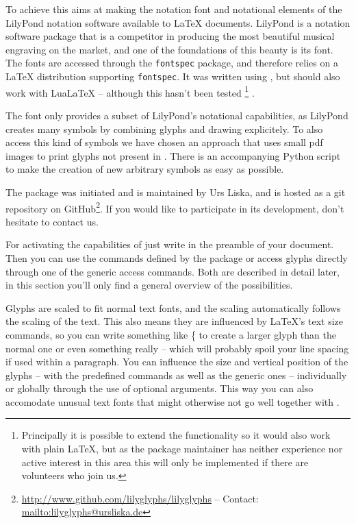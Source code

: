\documentclass{OLLbook}
\begin{document}
To achieve this \lilyglyphs aims at making the notation font and notational elements of the LilyPond notation software available to \LaTeX{} documents.
LilyPond is a notation software package that is a competitor in producing the most beautiful musical engraving on the market, and one of the foundations of this beauty is its \emmentaler font.
The \emmentaler fonts are accessed through the \texttt{fontspec} package, and \lilyglyphs therefore relies on a \LaTeX{} distribution supporting \texttt{fontspec}. 
It was written using , but should also work with LuaLaTeX -- although this hasn't been tested%
\footnote{Principally it is possible to extend the functionality so it would also work with plain \LaTeX, but as the package maintainer has neither experience nor active interest in this area this will only be implemented if there are volunteers who join us.}%
.

The \emmentaler font only provides a subset of LilyPond's notational capabilities, as LilyPond creates many symbols by combining glyphs and drawing explicitely.
To also access this kind of symbols we have chosen an approach that uses small pdf images to print glyphs not present in \emmentaler*.
There is an accompanying Python script to make the creation of new arbitrary symbols as easy as possible.

The \lilyglyphs package was initiated and is maintained by Urs Liska, and is hosted as a git repository on GitHub\footnote{\url{http://www.github.com/lilyglyphs/lilyglyphs} -- Contact: \url{mailto:lilyglyphs@ursliska.de}}.
If you would like to participate in its development, don't hesitate to contact us.

\bigskip
For activating the capabilities of \lilyglyphs just write  in the preamble of your document. 
Then you can use the commands defined by the package or access glyphs directly through one of the generic access commands.
Both are described in detail later, in this section you'll only find a general overview of the possibilities.

Glyphs are scaled to fit normal text fonts, and the scaling automatically follows the scaling of the text. 
This also means they are influenced by \LaTeX 's text size commands, so you can write something like \{ to create a larger {\Large \flat}glyph than the normal \flat one or even something really  {\Huge {}} -- which will probably spoil your line spacing if used within a paragraph. 
You can influence the size and vertical position of the glyphs -- with the predefined commands as well as the generic ones -- individually or globally through the use of optional arguments.
This way you can also accomodate unusual text fonts that might otherwise not go well together with \lilyglyphs*.
\end{document}

